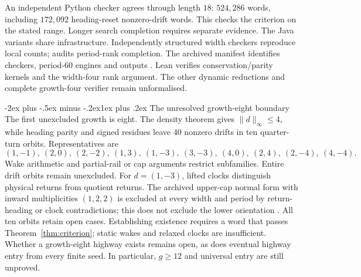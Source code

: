 \documentclass[11pt,letterpaper]{article}
\makeatletter
\renewcommand\section{\@startsection{section}{1}{\z@}%
  {-2ex plus -.5ex minus -.2ex}{1ex plus .2ex}%
  {\normalfont\Large\bfseries}}
\makeatother
\begin{document}
An independent Python checker agrees through length $18$: $524{,}286$
words, including $172{,}092$ heading-reset nonzero-drift words.
This checks the criterion on the stated range. Longer search completion
requires separate evidence. The Java variants share infrastructure.
Independently structured width checkers reproduce local counts;
 audits period-rank completion. The archived
manifest identifies checkers, period-$60$ engines and outputs \cite{Repo}.
Lean verifies conservation/parity kernels and the width-four rank
argument. The other dynamic reductions and complete growth-four verifier
remain unformalised.

\section{The unresolved growth-eight boundary}
The first unexcluded growth is eight. The density theorem gives
$\|d\|_\infty\le4$, while heading parity and signed residues leave
40 nonzero drifts in ten quarter-turn orbits. Representatives are
\[
(1,-1),\ (2,0),\ (2,-2),\ (1,3),\ (1,-3),\ (3,-3),
\ (4,0),\ (2,4),\ (2,-4),\ (4,-4).
\]
Wake arithmetic and partial-rail or cap arguments restrict subfamilies.
Entire drift orbits remain unexcluded. For $d=(1,-3)$, lifted clocks distinguish physical
returns from quotient returns. The archived upper-cap normal form with
inward multiplicities $(1,2,2)$ is excluded at every width and period
by return-heading or clock contradictions; this does not exclude the
lower orientation \cite{Repo}. All ten orbits retain open cases.
Establishing existence requires a word that passes
Theorem~\ref{thm:criterion}; static wakes and relaxed clocks are
insufficient. Whether a growth-eight highway exists remains open,
as does eventual highway entry from every finite seed. In particular,
$g\ge12$ and universal entry are still unproved.
\clearpage
\pagestyle{empty}
\end{document}
